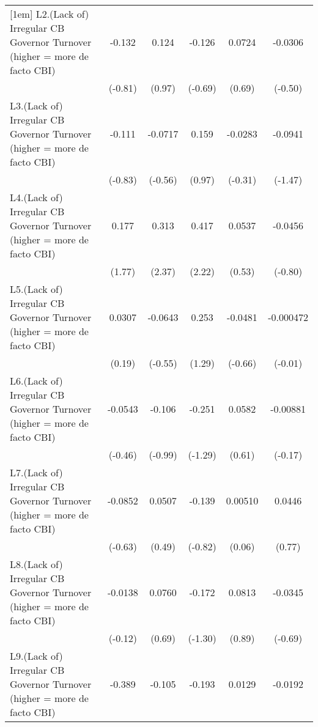 {\begin{longtable}{l*{5}{c}}
[1em]
L2.(Lack of) Irregular CB Governor Turnover (higher = more de facto CBI)&   -0.132         &    0.124         &   -0.126         &   0.0724         &  -0.0306         \\
                &  (-0.81)         &   (0.97)         &  (-0.69)         &   (0.69)         &  (-0.50)         \\
[1em]
L3.(Lack of) Irregular CB Governor Turnover (higher = more de facto CBI)&   -0.111         &  -0.0717         &    0.159         &  -0.0283         &  -0.0941         \\
                &  (-0.83)         &  (-0.56)         &   (0.97)         &  (-0.31)         &  (-1.47)         \\
[1em]
L4.(Lack of) Irregular CB Governor Turnover (higher = more de facto CBI)&    0.177         &    0.313\sym{*}  &    0.417\sym{*}  &   0.0537         &  -0.0456         \\
                &   (1.77)         &   (2.37)         &   (2.22)         &   (0.53)         &  (-0.80)         \\
[1em]
L5.(Lack of) Irregular CB Governor Turnover (higher = more de facto CBI)&   0.0307         &  -0.0643         &    0.253         &  -0.0481         &-0.000472         \\
                &   (0.19)         &  (-0.55)         &   (1.29)         &  (-0.66)         &  (-0.01)         \\
[1em]
L6.(Lack of) Irregular CB Governor Turnover (higher = more de facto CBI)&  -0.0543         &   -0.106         &   -0.251         &   0.0582         & -0.00881         \\
                &  (-0.46)         &  (-0.99)         &  (-1.29)         &   (0.61)         &  (-0.17)         \\
[1em]
L7.(Lack of) Irregular CB Governor Turnover (higher = more de facto CBI)&  -0.0852         &   0.0507         &   -0.139         &  0.00510         &   0.0446         \\
                &  (-0.63)         &   (0.49)         &  (-0.82)         &   (0.06)         &   (0.77)         \\
[1em]
L8.(Lack of) Irregular CB Governor Turnover (higher = more de facto CBI)&  -0.0138         &   0.0760         &   -0.172         &   0.0813         &  -0.0345         \\
                &  (-0.12)         &   (0.69)         &  (-1.30)         &   (0.89)         &  (-0.69)         \\
[1em]
L9.(Lack of) Irregular CB Governor Turnover (higher = more de facto CBI)&   -0.389\sym{*}  &   -0.105         &   -0.193         &   0.0129         &  -0.0192         \\

\end{longtable}}

